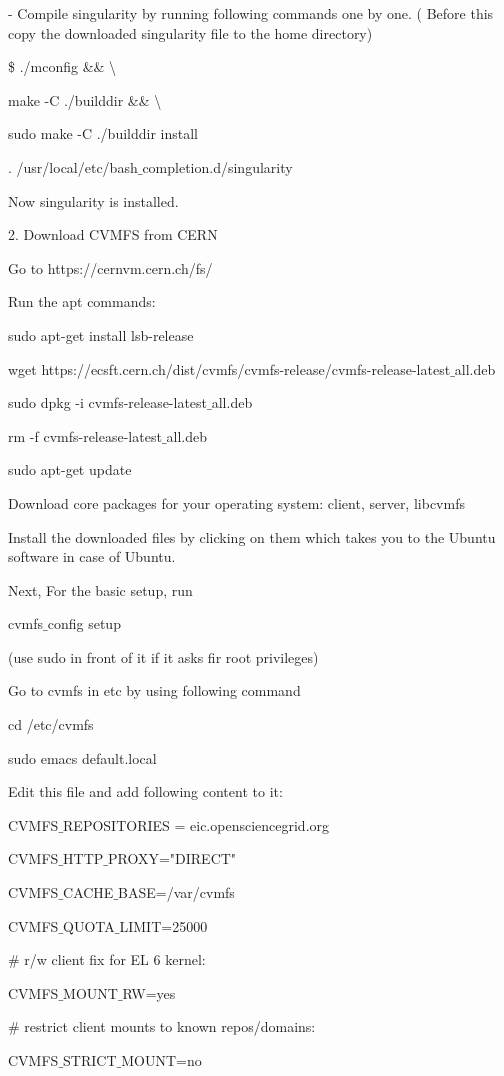 - Compile singularity by running following commands one by one. ( Before this copy the downloaded singularity file to the home directory) 

\$ .\slash mconfig \&\& \textbackslash

make -C .\slash builddir \&\& \textbackslash

sudo make -C .\slash builddir install

. \slash usr\slash local/etc/bash$\_$completion.d/singularity


Now singularity is installed.

2. Download CVMFS from CERN

Go to https://cernvm.cern.ch/fs/

Run the apt commands:

sudo apt-get install lsb-release

wget https://ecsft.cern.ch/dist/cvmfs/cvmfs-release/cvmfs-release-latest$\_$all.deb

sudo dpkg -i cvmfs-release-latest$\_$all.deb

rm -f cvmfs-release-latest$\_$all.deb

sudo apt-get update

Download core packages for your operating system: client, server, libcvmfs

Install the downloaded files by clicking on them which takes you to the Ubuntu software in case of Ubuntu.

Next, For the basic setup, run

cvmfs$\_$config setup

(use sudo in front of it if it asks fir root privileges)

Go to cvmfs in etc by using following command

cd /etc/cvmfs

sudo emacs default.local

Edit this file and add following content to it:

CVMFS$\_$REPOSITORIES = eic.opensciencegrid.org

CVMFS$\_$HTTP$\_$PROXY="DIRECT"

CVMFS$\_$CACHE$\_$BASE=/var/cvmfs

CVMFS$\_$QUOTA$\_$LIMIT=25000

\# r/w client fix for EL 6 kernel:

CVMFS$\_$MOUNT$\_$RW=yes

\# restrict client mounts to known repos/domains:

CVMFS$\_$STRICT$\_$MOUNT=no

